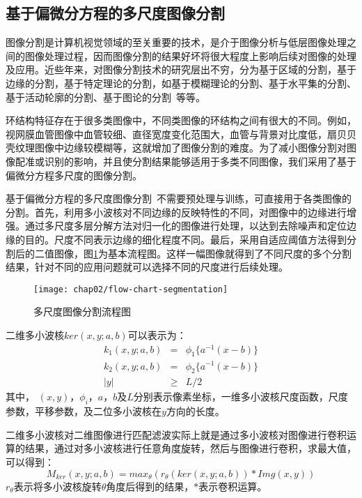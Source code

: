 \subsection{基于偏微分方程的多尺度图像分割}

图像分割是计算机视觉领域的至关重要的技术，是介于图像分析与低层图像处理之间的图像处理过程，因而图像分割的结果好坏将很大程度上影响后续对图像的处理及应用。近些年来，对图像分割技术的研究层出不穷，分为基于区域的分割，基于边缘的分割，基于特定理论的分割，如基于模糊理论的分割、基于水平集的分割、基于活动轮廓的分割、基于图论的分割~\cite{xuxiaoli}等等。

环结构特征存在于很多类图像中，不同类图像的环结构之间有很大的不同。例如，视网膜血管图像中血管较细、直径宽度变化范围大，血管与背景对比度低，扇贝贝壳纹理图像中边缘较模糊等，这就增加了图像分割的难度。为了减小图像分割对图像配准或识别的影响，并且使分割结果能够适用于多类不同图像，我们采用了基于偏微分方程多尺度的图像分割。

基于偏微分方程的多尺度图像分割~\cite{wang2013retinal}不需要预处理与训练，可直接用于各类图像的分割。首先，利用多小波核对不同边缘的反映特性的不同，对图像中的边缘进行增强。通过多尺度多层分解方法对归一化的图像进行处理，以达到去除噪声和定位边缘的目的。尺度不同表示边缘的细化程度不同。最后，采用自适应阈值方法得到分割后的二值图像，图\ref{fig:flow-segmentation}为基本流程图。这样一幅图像就得到了不同尺度的多个分割结果，针对不同的应用问题就可以选择不同的尺度进行后续处理。

\begin{figure}[H]
\centering
    \centering
    \texttt{[image: chap02/flow-chart-segmentation]}\medskip
\caption{多尺度图像分割流程图}
\label{fig:flow-segmentation}
\end{figure}

二维多小波核$ker(x,y;a,b)$可以表示为：
\begin{eqnarray}
k_1(x,y;a,b)&=&\phi_1\{a^{-1}(x-b)\}\\
k_2(x,y;a,b)&=&\phi_2\{a^{-1}(x-b)\}\\
|y| &\geq& L/2
\end{eqnarray}
其中， $(x,y)$，$\phi_i$，$a$，$b$及$L$分别表示像素坐标，一维多小波核尺度函数，尺度参数，平移参数，及二位多小波核在$y$方向的长度。

二维多小波核对二维图像进行匹配滤波实际上就是通过多小波核对图像进行卷积运算的结果，通过对多小波核进行任意角度旋转，然后与图像进行卷积，求最大值，可以得到：
\begin{equation}
M_{ker}(x,y;a,b) = max_\theta(r_\theta(ker(x,y;a,b)) \ast Img(x,y))
\end{equation} 
$r_\theta$表示将多小波核旋转$\theta$角度后得到的结果，$\ast$表示卷积运算。

